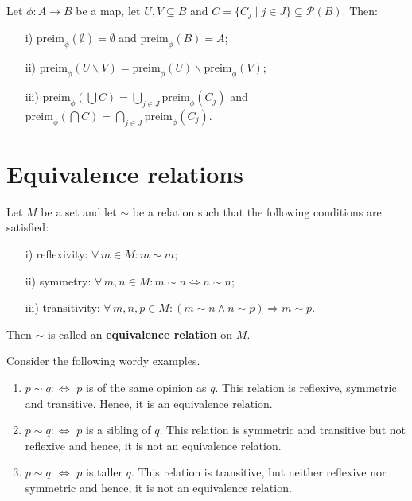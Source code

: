 \documentclass[root.tex]{subfiles}
\begin{document}
\begin{proposition}
Let $\phi : A \to B$ be a map, let $U,V \subseteq B$ and $C=\{C_j \mid j \in J\} \subseteq \mathcal{P}(B)$. Then:
\begin{enumerate}
\item[i)] $\mathrm{preim}_\phi(\emptyset)=\emptyset$ and $\mathrm{preim}_\phi(B)=A$;
\item[ii)] $\mathrm{preim}_\phi(U\backslash V)=\mathrm{preim}_\phi(U)\backslash \mathrm{preim}_\phi(V)$;
\item[iii)] $\mathrm{preim}_\phi(\bigcup C)=\bigcup_{j \in J} \mathrm{preim}_\phi(C_j)$
 and $\mathrm{preim}_\phi(\bigcap C)=\bigcap_{j \in J} \mathrm{preim}_\phi(C_j)$.
 \end{enumerate}
\end{proposition}

\section{Equivalence relations}%

\begin{mydef}
Let $M$ be a set and let $\sim$ be a relation such that the following conditions are satisfied:
\begin{enumerate}
\item[i)] reflexivity: $\forall \, m \in M: m \sim m;$
\item[ii)] symmetry: $\forall \, m,n \in M: m \sim n \Leftrightarrow n \sim n;$
\item[iii)] transitivity: $\forall \, m,n,p \in M: (m \sim n \land n \sim p) \Rightarrow m \sim p.$
\end{enumerate}
Then $\sim$ is called an \textbf{equivalence relation} on $M$.
\end{mydef}

\begin{myex}
Consider the following wordy examples.
\begin{enumerate}[label=\alph*)]
\item $p\sim q :\Leftrightarrow $ $p$ is of the same opinion as $q$. This relation is reflexive, symmetric and transitive. Hence, it is an equivalence relation.
\item $p\sim q :\Leftrightarrow $ $p$ is a sibling of $q$. This relation is symmetric and transitive but not reflexive and hence, it is not an equivalence relation.
\item $p\sim q :\Leftrightarrow $ $p$ is taller $q$. This relation is transitive, but neither reflexive nor symmetric and hence, it is not an equivalence relation.
\end{enumerate}
\end{myex}
\end{document}
